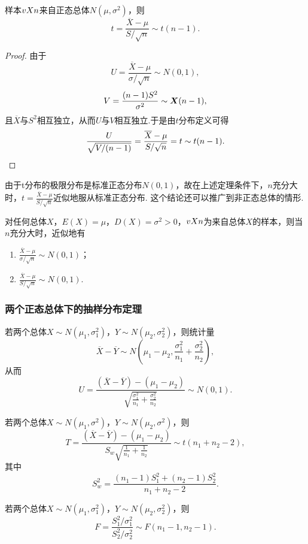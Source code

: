 \begin{theorem}
样本\(v{X}{n}\)来自正态总体\(N(\mu,\sigma^2)\)，则\[
t = \frac{\overline{X}-\mu}{S / \sqrt{n}} \sim t(n-1).
\]
\begin{proof}
由于\[
U = \frac{\overline{X}-\mu}{\sigma/\sqrt{n}} \sim N(0,1),
\]\[
V = \frac{(n-1)S^2}{\sigma^2} \sim \boldsymbol{X}(n-1),
\]且\(\overline{X}\)与\(S^2\)相互独立，从而\(U\)与\(V\)相互独立.于是由\(t\)分布定义可得\[
\frac{U}{\sqrt{V/(n-1)}}
=\frac{\overline{X}-\mu}{S/\sqrt{n}}
=t \sim t(n-1).
\qedhere
\]
\end{proof}
\end{theorem}
由于t分布的极限分布是标准正态分布\(N(0,1)\)，故在上述定理条件下，\(n\)充分大时，\(t = \frac{\overline{X}-\mu}{S / \sqrt{n}}\)近似地服从标准正态分布.
这个结论还可以推广到非正态总体的情形.
\begin{theorem}
对任何总体\(X\)，\(E(X)=\mu\)，\(D(X)=\sigma^2>0\)，\(v{X}{n}\)为来自总体\(X\)的样本，则当\(n\)充分大时，近似地有\begin{enumerate}
\item \(\frac{\overline{X}-\mu}{\sigma/\sqrt{n}} \sim N(0,1)\)；
\item \(\frac{\overline{X}-\mu}{S/\sqrt{n}} \sim N(0,1)\).
\end{enumerate}
\end{theorem}

\subsubsection{两个正态总体下的抽样分布定理}
\begin{theorem}
若两个总体\(X \sim N(\mu_1,\sigma_1^2)\)，\(Y \sim N(\mu_2,\sigma_2^2)\)，则统计量\[
\overline{X}-\overline{Y} \sim N\left(\mu_1-\mu_2,\frac{\sigma_1^2}{n_1}+\frac{\sigma_2^2}{n_2}\right),
\]从而\[
U = \frac{(\overline{X}-\overline{Y})-(\mu_1-\mu_2)}{\sqrt{\frac{\sigma_1^2}{n_1}+\frac{\sigma_2^2}{n_2}}} \sim N(0,1).
\]
\end{theorem}

\begin{theorem}
若两个总体\(X \sim N(\mu_1,\sigma^2)\)，\(Y \sim N(\mu_2,\sigma^2)\)，则\[
T = \frac{(\overline{X}-\overline{Y})-(\mu_1-\mu_2)}{S_w \sqrt{\frac{1}{n_1}+\frac{1}{n_2}}} \sim t(n_1+n_2-2),
\]其中\[
S_w^2 = \frac{(n_1-1)S_1^2+(n_2-1)S_2^2}{n_1+n_2-2}.
\]
\end{theorem}

\begin{theorem}
若两个总体\(X \sim N(\mu_1,\sigma_1^2)\)，\(Y \sim N(\mu_2,\sigma_2^2)\)，则\[
F = \frac{S_1^2 / \sigma_1^2}{S_2^2 / \sigma_2^2} \sim F(n_1-1,n_2-1).
\]
\end{theorem}

